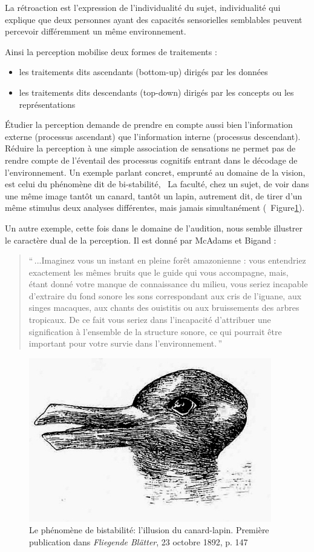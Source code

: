 La rétroaction est l'expression de l'individualité du sujet, individualité qui explique que deux personnes ayant des capacités sensorielles semblables peuvent percevoir différemment un même environnement.

Ainsi la perception mobilise deux formes de traitements :

\begin{itemize}
\item les traitements dits ascendants (bottom-up) dirigés par les données
\item les traitements dits descendants (top-down) dirigés par les concepts ou les représentations
\end{itemize}

Étudier la perception demande de prendre en compte aussi bien l'information externe (processus ascendant) que l'information interne (processus descendant). Réduire la perception à une simple association de sensations ne permet pas de rendre compte de l'éventail des processus cognitifs entrant dans le décodage de l'environnement. Un exemple parlant concret, emprunté au domaine de la vision, est celui du phénomène dit de bi-stabilité, \ie~La faculté, chez un sujet, de voir dans une même image tantôt un canard, tantôt un lapin, autrement dit, de tirer d'un même stimulus deux analyses différentes, mais jamais simultanément (\Cf~Figure\ref{fig:bistabilite}).

Un autre exemple, cette fois dans le domaine de l'audition, nous semble illustrer le caractère dual de la perception. Il est donné par McAdams et Bigand \citep[p. 2]{mcadams1994penser}:

\begin{quote}
``\,...Imaginez vous un instant en pleine forêt amazonienne : vous entendriez exactement les mêmes bruits que le guide qui vous accompagne, mais, étant donné votre manque de connaissance du milieu, vous seriez incapable d'extraire du fond sonore les sons correspondant aux cris de l'iguane, aux singes macaques, aux chants des ouistitis ou aux bruissements des arbres tropicaux. De ce fait vous seriez dans l'incapacité d'attribuer une signification à l'ensemble de la structure sonore, ce qui pourrait être important pour votre survie dans l'environnement.\,''
\end{quote}

\begin{figure}[bth]
        \myfloatalign
        \includegraphics[width=.6\linewidth]{gfx/canard_lapin}
        \caption[Le phénomène de bistabilité: l'illusion du canard-lapin]{Le phénomène de bistabilité: l'illusion du canard-lapin. Première publication dans \emph{Fliegende Blätter}, 23 octobre 1892, p. 147}\label{fig:bistabilite}
\end{figure}

